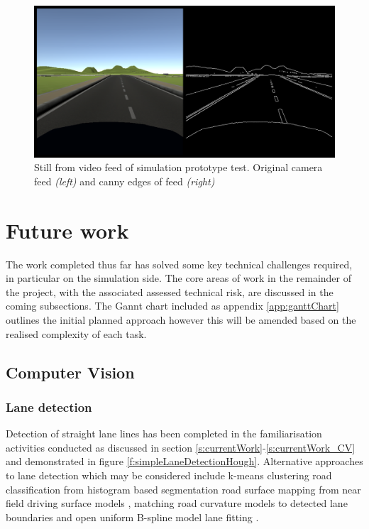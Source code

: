 \documentclass[]{aiaa-tc}%
\begin{document}
\begin{figure}[htb]%
 \includegraphics{simPrototypeIPC.png}
 \caption{Still from video feed of simulation prototype test. Original camera feed \textit{(left)} and canny edges of feed \textit{(right)}}
 \label{f:simPrototypeIPCTest}
\end{figure}

\section{Future work}

The work completed thus far has solved some key technical challenges required, in particular on the simulation side. The core areas of work in the remainder of the project, with the associated assessed technical risk, are discussed in the coming subsections. The Gannt chart included as appendix \ref{app:ganttChart} outlines the initial planned approach however this will be amended based on the realised complexity of each task.

\subsection{Computer Vision}

\subsubsection{Lane detection}

Detection of straight lane lines has been completed in the familiarisation activities conducted as discussed in section \ref{s:currentWork}-\ref{s:currentWork_CV} and demonstrated in figure \ref{f:simpleLaneDetectionHough}. Alternative approaches to lane detection which may be considered include k-means clustering \citep{ipmBasedLaneDetectionApproach} road classification from histogram based segmentation \citep{histogramSegmentationRoadClassification} road surface mapping from near field driving surface models \citep{darpaChallengeRoadDetection}, matching road curvature models to detected lane boundaries \citep{intersectionDetectionSingleCamera}  and open uniform B-spline model lane fitting \citep{ipmBasedLaneDetectionApproach}.
\end{document}
